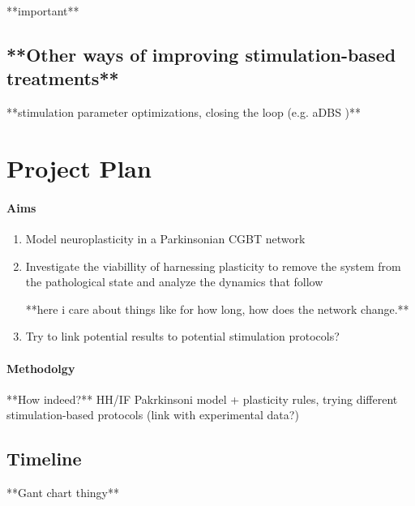 **important** \cite{duchet2023mean} \cite{shupe2021integrate} \cite{schwab2020spike}

\subsection{**Other ways of improving stimulation-based treatments**}
**stimulation parameter optimizations, closing the loop (e.g. aDBS \cite{beudel2018adaptive})**

\section{Project Plan}

\paragraph{Aims} \begin{enumerate}
	\item Model neuroplasticity in a Parkinsonian CGBT network
	\item Investigate the viabillity of harnessing plasticity to remove the
	      system from the pathological state and analyze the dynamics that follow

	      **here i care about things like for how long, how does the network change.**
	\item Try to link potential results to potential stimulation protocols?
\end{enumerate}

\paragraph{Methodolgy} **How indeed?** HH/IF Pakrkinsoni model + plasticity rules, trying
different stimulation-based protocols (link with experimental data?)

\subsection{Timeline}
**Gant chart thingy**


\newpage
{}


\newpage


